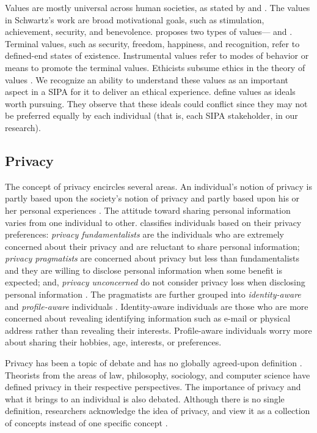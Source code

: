 Values are mostly universal across human societies, as stated by \citet{schwartz2012overview} and \citet{rokeach1973nature}. 
The values in Schwartz's  work are broad motivational goals, such as stimulation, achievement, security, and benevolence. 
\citet{rokeach1973nature} proposes two types of values--- and . 
Terminal values, such as security, freedom, happiness, and recognition, refer to defined-end states of existence. 
Instrumental values refer to modes of behavior or means to promote the terminal values. 
%
Ethicists subsume ethics in the theory of values \citep{Friedman+08:value-sensitive-design}.
% 
We recognize an ability to understand these values as an important aspect in a SIPA for it to deliver an ethical experience.
\citet{Dechesne-AIL13-Norms+Values} define values as ideals worth pursuing. They observe that these ideals could conflict since
they may not be preferred equally by each individual (that is, each SIPA stakeholder, in our research).


\subsection{Privacy}
The concept of privacy encircles several areas. An individual's notion of
privacy is partly based upon the society's notion of privacy and partly
based upon his or her personal experiences \citep{westin1967privacy,
westin2003social}. The attitude toward sharing personal
information varies from one individual to other.
\citet{westin1967privacy} classifies individuals based on their privacy
preferences: \textit{privacy fundamentalists} are the individuals who
are extremely concerned about their privacy and are reluctant to share
personal information; \textit{privacy pragmatists} are concerned about
privacy but less than fundamentalists and they are willing to disclose
personal information when some benefit is expected; and,
\textit{privacy unconcerned} do not consider privacy loss when
disclosing personal information \citep{westin1967privacy}. The
pragmatists are further grouped into \emph{identity-aware} and \emph{profile-aware}
individuals \citep{spiekermann2009enggprivacy}. Identity-aware
individuals are those who are more concerned about revealing
identifying information such as e-mail or physical address rather than
revealing their interests. Profile-aware individuals worry more about
sharing their hobbies, age, interests, or preferences.

Privacy has been a topic of debate and has no globally
agreed-upon definition \citep{smith2007privacy}. Theorists from the
areas of law, philosophy, sociology, and computer science have 
defined privacy in their respective perspectives.
The importance of privacy and what it brings to an individual is also
debated. Although there is no single definition, researchers 
acknowledge the idea of privacy, and view it as a
collection of concepts instead of one specific concept
\citep{smith2007privacy}. 

